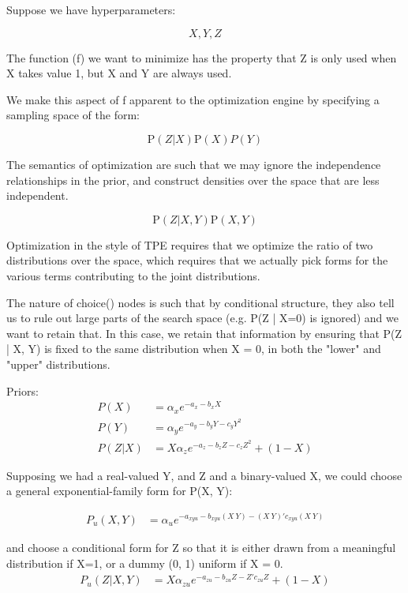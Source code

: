 \documentclass{article}
\begin{document}
Suppose we have hyperparameters:

\begin{equation}
    X, Y, Z
\end{equation}

The function (f) we want to minimize has the property that Z is only used when
X takes value 1, but X and Y are always used.

We make this aspect of f apparent to the optimization engine by specifying a
sampling space of the form:

\begin{equation}
    \mathrm{P}(Z | X) \mathrm{P}(X) P(Y)
\end{equation}

The semantics of optimization are such that we may ignore the independence
relationships in the prior, and construct densities over the space that are
less independent.


\begin{equation}
    \mathrm{P}(Z | X, Y) \mathrm{P}(X, Y)
\end{equation}


Optimization in the style of TPE requires that we optimize the ratio of two
distributions over the space, which requires that we actually pick forms for
the various terms contributing to the joint distributions.

The nature of choice() nodes is such that by conditional structure, they also
tell us to rule out large parts of the search space (e.g. P(Z | X=0) is
ignored) and we want to retain that.  In this case, we retain that information
by ensuring that P(Z | X, Y) is fixed to the same distribution when X = 0, in
both the "lower" and "upper" distributions.

Priors:
\begin{align}
    P(X) &= \alpha_{x} e^{-a_{x} - b_{x}X} \\
    P(Y) &= \alpha_{y} e^{-a_{y} - b_{y}Y - c_{y}Y^2} \\
    P(Z|X) &= X \alpha_{z} e^{-a_{z} - b_{z}Z - c_{z}Z^2} + (1 - X)
\end{align}


Supposing we had a real-valued Y, and Z and a binary-valued X, we could choose a general exponential-family form for P(X, Y):

\begin{align}
    P_u(X, Y)
    &= \alpha_u e^{ -a_{xyu} -b_{xyu} (X~Y) -(X~Y)'c_{xyu}(X~Y)}
\end{align}

and choose a conditional form for Z so that it is either drawn from a meaningful distribution if X=1,
or a dummy (0, 1) uniform if X = 0.
\begin{align}
    P_u(Z | X, Y)
    &= X \alpha_{zu} e^{-a_{zu} - b_{zu}Z - Z'c_{zu}Z} + (1 - X)
\end{align}
\end{document}
